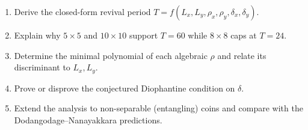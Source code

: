 \begin{enumerate}[nosep]
\item Derive the closed-form revival period
$T = f(L_x,L_y,\rho_x,\rho_y,\delta_x,\delta_y)$.
\item Explain why $5\times5$ and $10\times10$ support $T=60$ while
$8\times8$ caps at $T=24$.
\item Determine the minimal polynomial of each algebraic $\rho$ and
relate its discriminant to $L_x,L_y$.
\item Prove or disprove the conjectured Diophantine condition on
$\delta$.
\item Extend the analysis to non-separable (entangling) coins and
compare with the Dodangodage--Nanayakkara predictions.
\end{enumerate}
